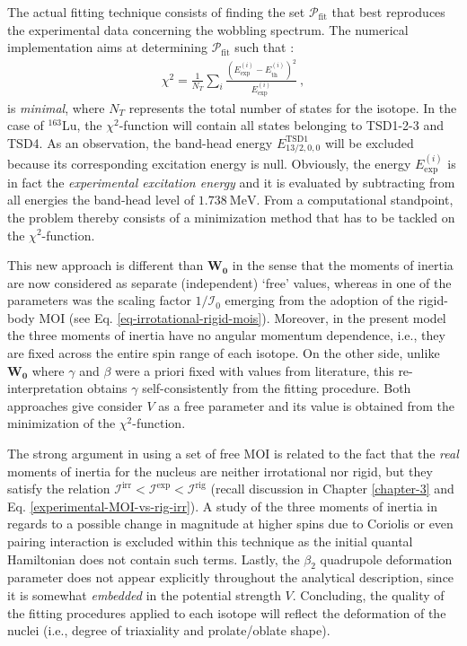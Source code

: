 The actual fitting technique consists of finding the set $\mathcal{P}_\text{fit}$ that best reproduces the experimental data concerning the wobbling spectrum. The numerical implementation aims at determining $\mathcal{P}_\text{fit}$ such that \cite{poenaru2021extensive1}:
\begin{align}
    \chi^2=\frac{1}{N_T}\sum_i\frac{\left(E_\text{exp}^{(i)}-E_\text{th}^{(i)}\right)^2}{E_\text{exp}^{(i)}}\ ,
    \label{chi-2-fitting-function}
\end{align}
is \emph{minimal}, where $N_T$ represents the total number of states for the isotope. In the case of $^{163}$Lu, the $\chi^2$-function will contain all states belonging to TSD1-2-3 and TSD4. As an observation, the band-head energy $E_{13/2,0,0}^\text{TSD1}$ will be excluded because its corresponding excitation energy is null. Obviously, the energy $E_\text{exp}^{(i)}$ is in fact the \emph{experimental excitation energy} and it is evaluated by subtracting from all energies the band-head level of $1.738\ \text{MeV}$. From a computational standpoint, the problem thereby consists of a minimization method that has to be tackled on the $\chi^2$-function.

This new approach is different than $\mathbf{W_0}$ in the sense that the moments of inertia are now considered as separate (independent) `free' values, whereas in \cite{raduta2017semiclassical} one of the parameters was the scaling factor $1/\mathcal{I}_0$ emerging from the adoption of the rigid-body MOI (see Eq. \ref{eq-irrotational-rigid-mois}). Moreover, in the present model the three moments of inertia have no angular momentum dependence, i.e., they are fixed across the entire spin range of each isotope. On the other side, unlike $\mathbf{W_0}$ where $\gamma$ and $\beta$ were a priori fixed with values from literature, this re-interpretation obtains $\gamma$ self-consistently from the fitting procedure. Both approaches give consider $V$ as a free parameter and its value is obtained from the minimization of the $\chi^2$-function.

The strong argument in using a set of free MOI is related to the fact that the \emph{real} moments of inertia for the nucleus are neither irrotational nor rigid, but they satisfy the relation $\mathcal{I}^\text{irr}<\mathcal{I}^\text{exp}<\mathcal{I}^\text{rig}$ (recall discussion in Chapter \ref{chapter-3} and Eq. \ref{experimental-MOI-vs-rig-irr}). A study of the three moments of inertia in regards to a possible change in magnitude at higher spins due to Coriolis or even pairing interaction is excluded within this technique as the initial quantal Hamiltonian does not contain such terms. Lastly, the $\beta_2$ quadrupole deformation parameter does not appear explicitly throughout the analytical description, since it is somewhat \emph{embedded} in the potential strength $V$. Concluding, the quality of the fitting procedures applied to each isotope will reflect the deformation of the nuclei (i.e., degree of triaxiality and prolate/oblate shape).


